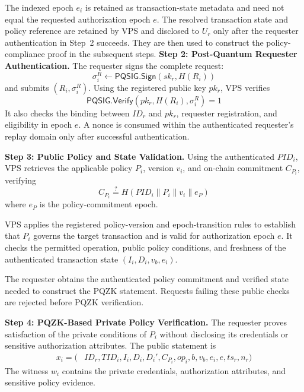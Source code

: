 \documentclass[lettersize,journal]{IEEEtran}
\begin{document}
    The indexed epoch $e_i$ is retained as
    transaction-state metadata and need not equal
    the requested authorization epoch $e$.
    The resolved transaction state and policy
    reference are retained by VPS and disclosed
    to $U_r$ only after the requester authentication
    in Step~2 succeeds. They are then used to
    construct the policy-compliance proof in the
    subsequent steps.
    \medskip
    \noindent\textbf{Step 2: Post-Quantum Requester
    Authentication.}
    The requester signs the complete request:
    \begin{equation}
    \sigma_i^R\leftarrow
    \mathsf{PQSIG.Sign}(sk_r,H(R_i))
    \end{equation}
    and submits $(R_i,\sigma_i^R)$.
    Using the registered public key $pk_r$,
    VPS verifies
    \begin{equation}
    \mathsf{PQSIG.Verify}
    (pk_r,H(R_i),\sigma_i^R)=1
    \end{equation}
    It also checks the binding between $ID_r$
    and $pk_r$, requester registration, and
    eligibility in epoch $e$. A nonce is consumed
    within the authenticated requester's replay
    domain only after successful authentication.
    
    \medskip
    \noindent\textbf{Step 3: Public Policy and
    State Validation.}
    Using the authenticated $PID_i$, VPS
    retrieves the applicable policy $P_i$,
    version $v_i$, and on-chain commitment
    $C_{P_i}$, verifying
    \begin{equation}
    C_{P_i}\stackrel{?}{=}
    H(PID_i\parallel P_i\parallel v_i\parallel e_P)
    \end{equation}
    where $e_P$ is the policy-commitment epoch.
    
    VPS applies the registered policy-version
    and epoch-transition rules to establish
    that $P_i$ governs the target transaction
    and is valid for authorization epoch $e$.
    It checks the permitted operation, public
    policy conditions, and freshness of the
    authenticated transaction state
    $(I_i,D_i,v_b,e_i)$.
    
    The requester obtains the authenticated
    policy commitment and verified state
    needed to construct the PQZK statement.
    Requests failing these public checks
    are rejected before PQZK verification.
    
    \medskip
    \noindent\textbf{Step 4: PQZK-Based Private
    Policy Verification.}
    The requester proves satisfaction of the
    private conditions of $P_i$ without
    disclosing its credentials or sensitive
    authorization attributes. The public
    statement is
    \begin{equation}
    \begin{aligned}
    x_i=\big(&ID_r,TID_i,I_i,D_i,D_i',
    C_{P_i},op_i,b,v_b,e_i,e,ts_r,n_r\big)
    \end{aligned}
    \end{equation}
    The witness $w_i$ contains the private
    credentials, authorization attributes,
    and sensitive policy evidence.
    
\end{document}
